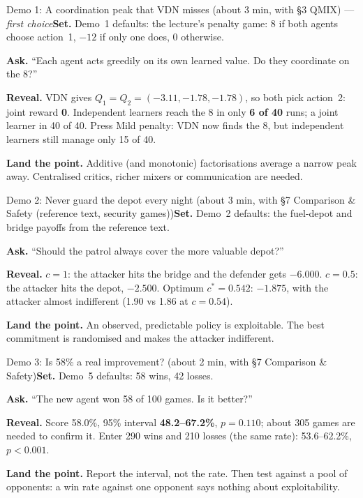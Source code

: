 \documentclass[11pt]{article}
\begin{document}
\begin{live}{Demo 1: A coordination peak that VDN misses (about 3 min, with \S3 QMIX) --- \emph{first choice}}\textbf{Set.} Demo~1 defaults: the lecture's penalty game: 8 if both agents choose action~1, $-12$ if only one does, 0 otherwise.\par\smallskip\textbf{Ask.} ``Each agent acts greedily on its own learned value. Do they coordinate on the 8?''\par\smallskip\textbf{Reveal.} VDN gives $Q_1=Q_2=(-3.11,-1.78,-1.78)$, so both pick action~2: joint reward \textbf{0}. Independent learners reach the 8 in only \textbf{6 of 40} runs; a joint learner in 40 of 40. Press \textsf{Mild penalty}: VDN now finds the 8, but independent learners still manage only 15 of 40.\par\smallskip\textbf{Land the point.} Additive (and monotonic) factorisations average a narrow peak away. Centralised critics, richer mixers or communication are needed.\end{live}

\begin{live}{Demo 2: Never guard the depot every night (about 3 min, with \S7 Comparison \& Safety (reference text, security games))}\textbf{Set.} Demo~2 defaults: the fuel-depot and bridge payoffs from the reference text.\par\smallskip\textbf{Ask.} ``Should the patrol always cover the more valuable depot?''\par\smallskip\textbf{Reveal.} $c=1$: the attacker hits the bridge and the defender gets \textbf{$-6.000$}. $c=0.5$: the attacker hits the depot, $-2.500$. Optimum $c^*=0.542$: \textbf{$-1.875$}, with the attacker almost indifferent (1.90 vs 1.86 at $c=0.54$).\par\smallskip\textbf{Land the point.} An observed, predictable policy is exploitable. The best commitment is randomised and makes the attacker indifferent.\end{live}

\begin{live}{Demo 3: Is 58\% a real improvement? (about 2 min, with \S7 Comparison \& Safety)}\textbf{Set.} Demo~5 defaults: 58 wins, 42 losses.\par\smallskip\textbf{Ask.} ``The new agent won 58 of 100 games. Is it better?''\par\smallskip\textbf{Reveal.} Score 58.0\%, 95\% interval \textbf{48.2--67.2\%}, $p=0.110$; about 305 games are needed to confirm it. Enter 290 wins and 210 losses (the same rate): 53.6--62.2\%, $p<0.001$.\par\smallskip\textbf{Land the point.} Report the interval, not the rate. Then test against a pool of opponents: a win rate against one opponent says nothing about exploitability.\end{live}
\end{document}
